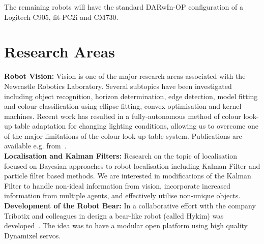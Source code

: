 \documentclass{llncs}
\begin{document}
The remaining robots will have the standard DARwIn-OP configuration of a Logitech C905, fit-PC2i and CM730.

\section{Research Areas}

\noindent\textbf{Robot Vision:} Vision is one of the major research areas associated with the Newcastle Robotics Laboratory. Several subtopics have been investigated including object recognition, horizon determination, edge detection, model fitting and colour classification using ellipse fitting, convex optimisation and kernel machines. Recent work has resulted in a fully-autonomous method of colour look-up table adaptation for changing lighting conditions, allowing us to overcome one of the major limitations of the colour look-up table system. Publications are available e.g. from~\cite{budden2012colour,budden2012ball,henderson_2007,nickin_2007,NUBOT2006,Henderson2008,flannery2013ransac,budden2013salient}.
\\

\noindent\textbf{Localisation and Kalman Filters:} Research on the
topic of localisation focused on Bayesian approaches to robot
localisation including Kalman Filter and particle filter
based methods. We are interested in
modifications of the Kalman Filter to handle non-ideal information
from vision, incorporate increased information from multiple agents,
and effectively utilise non-unique objects.
\\

\noindent\textbf{Development of the Robot Bear:} In a collaborative
effort with the company Tribotix and colleagues in design a
bear-like robot (called Hykim) was developed~\cite{ChalupEtAl2006}. The idea was to have a modular open platform using high quality Dynamixel servos.
\\
\end{document}
